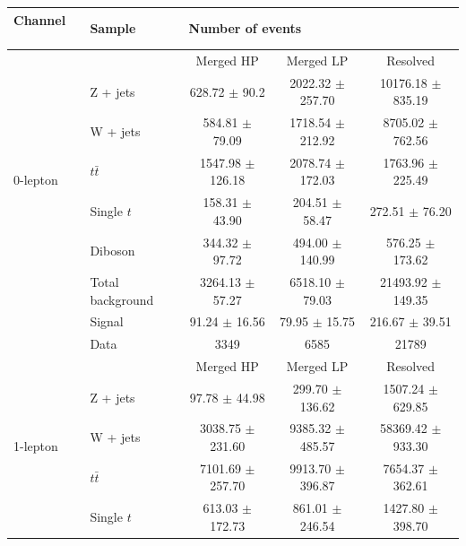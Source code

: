 \begin{table}[htbp]
\begin{center}
\begin{tabular}{| l | l | c | c | c |} \hline
Channel          　& Sample        & \multicolumn{3}{|l|}{Number of events} \\ \hline \hline
\multirow{7}{*}{0-lepton} &               & Merged HP  & Merged LP  & Resolved  \\ \cline{2-5}
                   & Z + jets     & 628.72 $\pm$ 90.2           & 2022.32 $\pm$ 257.70           & 10176.18 $\pm$ 835.19\\ 
                   & W + jets     & 584.81 $\pm$ 79.09           & 1718.54 $\pm$ 212.92           & 8705.02 $\pm$ 762.56\\  
                   & $t\bar{t}$   & 1547.98 $\pm$ 126.18           &  2078.74 $\pm$ 172.03          & 1763.96 $\pm$ 225.49\\ 
                   & Single $t$         & 158.31 $\pm$ 43.90           &   204.51 $\pm$ 58.47         & 272.51 $\pm$ 76.20  \\ 
                   & Diboson      &  344.32 $\pm$ 97.72           &  494.00 $\pm$ 140.99          & 576.25 $\pm$ 173.62\\ \cline{2-5}
                   & Total background    & 3264.13 $\pm$ 57.27           &  6518.10 $\pm$ 79.03          &21493.92 $\pm$ 149.35\\ \cline{2-5}
                   & Signal       & 91.24 $\pm$ 16.56           &   79.95 $\pm$ 15.75         & 216.67 $\pm$ 39.51\\ \cline{2-5}
                   & Data         & 3349           & 6585           &21789\\ \hline \hline
\multirow{7}{*}{1-lepton} &               & Merged HP  & Merged LP  & Resolved  \\ \cline{2-5}
                   & Z + jets     & 97.78 $\pm$ 44.98           & 299.70 $\pm$ 136.62           &1507.24 $\pm$ 629.85\\ 
                   & W + jets     & 3038.75 $\pm$ 231.60           &  9385.32 $\pm$ 485.57          &58369.42 $\pm$ 933.30\\  
                   & $t\bar{t}$   & 7101.69 $\pm$ 257.70           &  9913.70 $\pm$ 396.87          &7654.37 $\pm$ 362.61\\ 
                   & Single $t$         & 613.03 $\pm$ 172.73           &  861.01 $\pm$ 246.54          & 1427.80 $\pm$ 398.70\\ 

\end{tabular}
\end{center}
\end{table}
